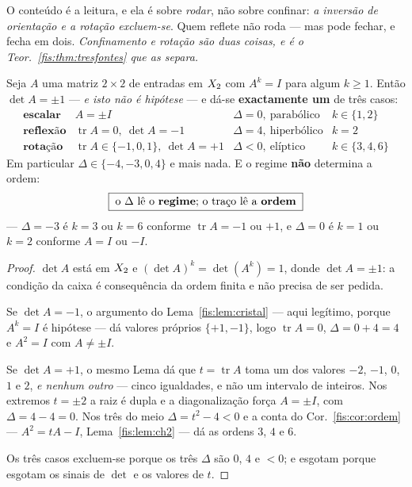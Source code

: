 \documentclass[livro.tex]{subfiles}
\begin{document}
\medskip\noindent O conteúdo é a leitura, e ela é sobre \emph{rodar}, não sobre
confinar: \emph{a inversão de orientação e a rotação excluem-se}. Quem reflete
não roda --- mas pode fechar, e fecha em dois. \emph{Confinamento e rotação são
duas coisas, e é o Teor.~\ref{fis:thm:tresfontes} que as separa.}

\begin{teorema}\label{fis:thm:tresfontes}
Seja $A$ uma matriz $2\times2$ de entradas em $X_2$ com $A^{k}=I$ para algum
$k\ge1$. Então $\det A=\pm1$ --- \emph{e isto não é hipótese} --- e dá-se
\textbf{exactamente um} de três casos:
\[
\begin{array}{lllc}
\textbf{escalar} & A=\pm I & \Delta=0,\ \text{parabólico} & k\in\{1,2\}\\[2pt]
\textbf{reflexão} & \operatorname{tr}A=0,\ \det A=-1 & \Delta=4,\ \text{hiperbólico} & k=2\\[2pt]
\textbf{rotação} & \operatorname{tr}A\in\{-1,0,1\},\ \det A=+1 & \Delta<0,\ \text{elíptico} & k\in\{3,4,6\}
\end{array}
\]
Em particular $\Delta\in\{-4,-3,0,4\}$ e mais nada. E o regime \textbf{não}
determina a ordem:
\[
\boxed{\;\text{o }\Delta\text{ lê o \textbf{regime}; o traço lê a \textbf{ordem}}\;}
\]
--- $\Delta=-3$ é $k=3$ ou $k=6$ conforme $\operatorname{tr}A=-1$ ou $+1$, e
$\Delta=0$ é $k=1$ ou $k=2$ conforme $A=I$ ou $-I$.
\end{teorema}

\begin{proof}
$\det A$ está em $X_2$ e $(\det A)^{k}=\det(A^{k})=1$, donde $\det A=\pm1$: a
condição da caixa é consequência da ordem finita e não precisa de ser pedida.

Se $\det A=-1$, o argumento do Lema~\ref{fis:lem:cristal} --- aqui legítimo,
porque $A^{k}=I$ é hipótese --- dá valores próprios $\{+1,-1\}$, logo
$\operatorname{tr}A=0$, $\Delta=0+4=4$ e $A^{2}=I$ com $A\neq\pm I$.

Se $\det A=+1$, o mesmo Lema dá que $t=\operatorname{tr}A$ toma um dos valores
$-2$, $-1$, $0$, $1$ e $2$, \emph{e nenhum outro} --- cinco igualdades, e não um
intervalo de inteiros. Nos
extremos $t=\pm2$ a raiz é dupla e a diagonalização força $A=\pm I$, com
$\Delta=4-4=0$. Nos três do meio $\Delta=t^{2}-4<0$ e a conta do
Cor.~\ref{fis:cor:ordem} --- $A^{2}=tA-I$, Lema~\ref{fis:lem:ch2} --- dá as
ordens $3$, $4$ e $6$.

Os três casos excluem-se porque os três $\Delta$ são $0$, $4$ e $<0$; e esgotam
porque esgotam os sinais de $\det$ e os valores de $t$.
\end{proof}
\end{document}
